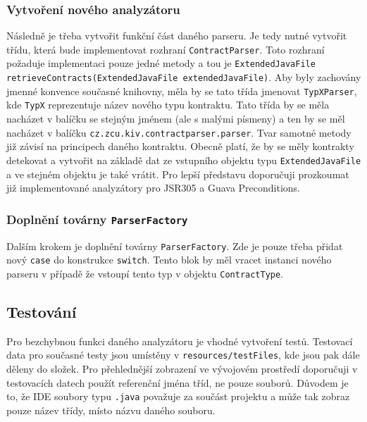 	    	\subsubsection{Vytvoření nového analyzátoru}
	    		Následně je třeba vytvořit funkční část daného parseru. Je tedy nutné vytvořit třídu, která bude implementovat rozhraní \texttt{ContractParser}. Toto rozhraní požaduje implementaci pouze jedné metody a tou je \texttt{ExtendedJavaFile retrieveContracts(ExtendedJavaFile extendedJavaFile)}. Aby byly zachovány jmenné konvence současné knihovny, měla by se tato třída jmenovat \texttt{TypXParser}, kde \texttt{TypX} reprezentuje název nového typu kontraktu. Tato třída by se měla nacházet v balíčku se stejným jménem (ale s malými písmeny) a ten by se měl nacházet v balíčku \texttt{cz.zcu.kiv.contractparser.parser}. Tvar samotné metody již závisí na principech daného kontraktu. Obecně platí, že by se měly kontrakty detekovat a vytvořit na základě dat ze vstupního objektu typu \texttt{ExtendedJavaFile} a ve stejném objektu je také vrátit. Pro lepší představu doporučuji prozkoumat již implementované analyzátory pro JSR305 a Guava Preconditions.
	    		
	    	\subsubsection{Doplnění továrny \texttt{ParserFactory}} 
	    		Dalším krokem je doplnění továrny \texttt{ParserFactory}. Zde je pouze třeba přidat nový \texttt{case} do konstrukce \texttt{switch}. Tento blok by měl vracet instanci nového parseru v případě že vstoupí tento typ v objektu \texttt{ContractType}.
	    			
	    	\subsection{Testování}
	    		Pro bezchybnou funkci daného analyzátoru je vhodné vytvoření testů. Testovací data pro současné testy jsou umístěny v \texttt{resources/testFiles}, kde jsou pak dále děleny do složek. Pro přehlednější zobrazení ve vývojovém prostředí doporučuji v testovacích datech použít referenční jména tříd, ne pouze souborů. Důvodem je to, že IDE soubory typu \texttt{.java} považuje za součást projektu a může tak zobraz pouze název třídy, místo názvu daného souboru.

    
    
    
    
